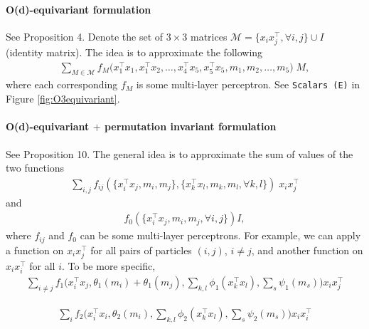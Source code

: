 \documentclass{article}
\begin{document}
\paragraph{O(d)-equivariant formulation} See Proposition 4. Denote the set of $3\times 3$ matrices $\mathcal{M} = \{x_ix_j^\top, \forall i,j\}\cup{I}$ (identity matrix). The idea is to approximate the following
\begin{align}
    \sum_{M\in\mathcal{M}}f_{M}\big(x_1^\top x_1,x_1^\top x_2, \ldots, x_4^\top x_5, x_5^\top x_5, m_1,m_2,\ldots,m_5\big)\; M,
\end{align}
where each corresponding $f_{M}$ is some multi-layer perceptron. See \texttt{Scalars (E)} in Figure \ref{fig:O3equivariant}.
\paragraph{O(d)-equivariant $+$ permutation invariant formulation}
See Proposition 10. 
The general idea is to approximate the sum of values of the two functions 
\begin{align}
    \sum_{i,j}f_{ij}(\{x_i^\top x_j, m_i,m_j\}, \{x_k^\top x_l,m_k, m_l,\forall k,l\})\; x_ix_j^\top 
\end{align}
and 
\begin{align}
    f_0(\{x_i^\top x_j, m_i,m_j, \forall i,j\}) I,
\end{align}
where $f_{ij}$ and $f_0$ can be some multi-layer perceptrons. 
For example, we can apply a function on $x_ix_j^\top$ for all pairs of particles $(i,j)$, $i\neq j$, and another function on $x_ix_i^\top$ for all $i$. To be more specific, 
\begin{align}
    \sum_{i\neq j} f_1\big(x_i^\top x_j, \theta_1(m_i)+\theta_1(m_j), \sum_{k,l}\phi_1(x_k^\top x_l), \sum_s\psi_1(m_s)\big) x_ix_j^\top
\end{align}

\begin{align}
    \sum_{i} f_2\big(x_i^\top x_i, \theta_2(m_i), \sum_{k,l}\phi_2(x_k^\top x_l), \sum_s\psi_2(m_s)\big) x_ix_i^\top
\end{align}
\end{document}
